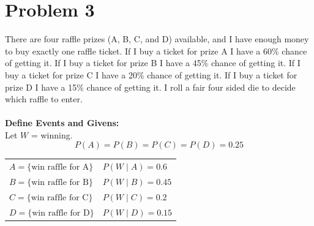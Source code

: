 ﻿\documentclass[12pt]{article}
\begin{document}
\section*{Problem 3}
There are four raffle prizes (A, B, C, and D) available, and I have enough money to buy exactly one raffle ticket. If I buy a ticket for prize A I have a 60\% chance of getting it. If I buy a ticket for prize B I have a 45\% chance of getting it. If I buy a ticket for prize C I have a 20\% chance of getting it. If I buy a ticket for prize D I have a 15\% chance of getting it. I roll a fair four sided die to decide which raffle to enter.\\\\
\textbf{Define Events and Givens:}\\
Let $W$ = winning.
\[
P(A)=P(B)=P(C)=P(D)=0.25
\]
\begin{center}
\renewcommand{\arraystretch}{1.5}
\begin{tabular}{ll}
$A=\{\text{win raffle for A}\}$ & $P(W\mid A)=0.6$ \\
$B=\{\text{win raffle for B}\}$ & $P(W\mid B)=0.45$ \\
$C=\{\text{win raffle for C}\}$ & $P(W\mid C)=0.2$ \\
$D=\{\text{win raffle for D}\}$ & $P(W\mid D)=0.15$
\end{tabular}
\end{center}
\end{document}
